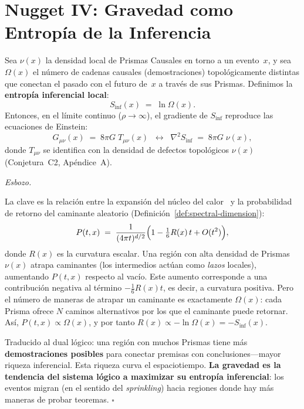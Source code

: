 \documentclass[11pt, a4paper, openany]{book}
\renewenvironment{proof}[1][Demostraci\'on]{%
  \par\noindent\textit{#1.}\quad
}{\hfill$\square$\par\medskip}
\begin{document}
\section{Nugget IV: Gravedad como Entrop\'ia de la Inferencia}

\begin{theorem}
\label{thm:gravity-inference-entropy}
Sea $\nu(x)$ la densidad local de Prismas Causales en torno a un
evento~$x$, y sea $\Omega(x)$ el n\'umero de cadenas causales
(demostraciones) topol\'ogicamente distintas que conectan el pasado
con el futuro de~$x$ a trav\'es de sus Prismas. Definimos la
\textbf{entrop\'ia inferencial local}:
\begin{equation}
  S_{\text{inf}}(x) \;=\; \ln \Omega(x).
  \label{eq:inferential-entropy}
\end{equation}
Entonces, en el l\'imite continuo ($\rho \to \infty$), el gradiente
de $S_{\text{inf}}$ reproduce las ecuaciones de Einstein:
\begin{equation}
  G_{\mu\nu}(x) \;=\; 8\pi G \; T_{\mu\nu}(x)
  \;\;\longleftrightarrow\;\;
  \nabla^2 S_{\text{inf}} \;=\; 8\pi G \;\nu(x),
  \label{eq:einstein-as-entropy}
\end{equation}
donde $T_{\mu\nu}$ se identifica con la densidad de defectos
topol\'ogicos $\nu(x)$ (Conjetura~C2, Ap\'endice~A).
\end{theorem}

\begin{proof}[Esbozo]
La clave es la relaci\'on entre la expansi\'on del n\'ucleo del
calor~\cite{minakshisundaram1949,gilkey1975} y la probabilidad de
retorno del caminante aleatorio
(Definici\'on~\ref{def:spectral-dimension}):
\[
  P(t, x) \;=\; \frac{1}{(4\pi t)^{d/2}}
  \Bigl(1 - \tfrac{1}{6}R(x)\,t + O(t^2)\Bigr),
\]
donde $R(x)$ es la curvatura escalar. Una regi\'on con alta densidad
de Prismas $\nu(x)$ atrapa caminantes (los intermedios act\'uan como
\emph{lazos} locales), aumentando $P(t,x)$ respecto al vac\'io. Este
aumento corresponde a una contribuci\'on negativa al t\'ermino
$-\tfrac{1}{6}R(x)t$, es decir, a curvatura positiva. Pero el
n\'umero de maneras de atrapar un caminante es exactamente
$\Omega(x)$: cada Prisma ofrece $N$ caminos alternativos por los que
el caminante puede retornar. As\'i, $P(t,x) \propto \Omega(x)$, y
por tanto $R(x) \propto -\ln \Omega(x) = -S_{\text{inf}}(x)$.

Traducido al dual l\'ogico: una regi\'on con muchos Prismas tiene
m\'as \textbf{demostraciones posibles} para conectar premisas con
conclusiones---mayor riqueza inferencial. Esta riqueza curva el
espaciotiempo. \textbf{La gravedad es la tendencia del sistema
l\'ogico a maximizar su entrop\'ia inferencial}: los eventos migran
(en el sentido del \emph{sprinkling}) hacia regiones donde hay m\'as
maneras de probar teoremas.
\end{proof}
\end{document}
